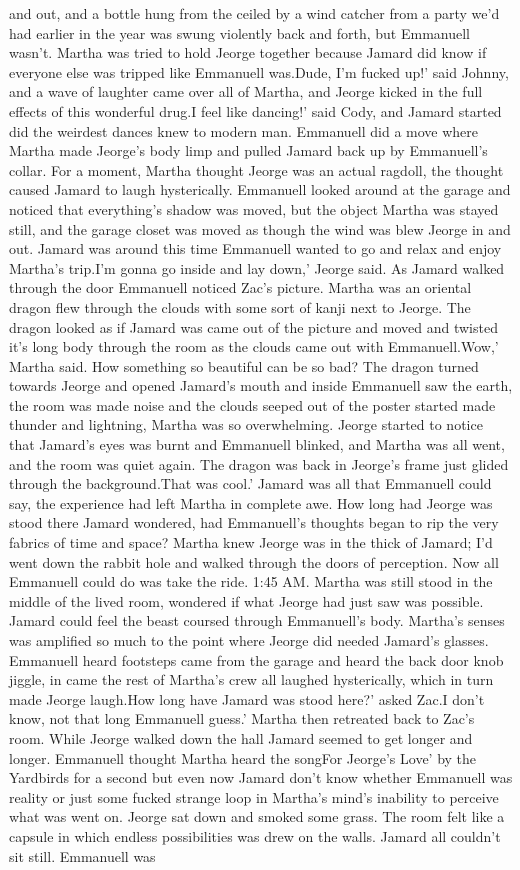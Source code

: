 \documentclass[12pt]{book}
\begin{document}
and out, and a bottle hung from the ceiled by a wind catcher from a party we'd had earlier in the year was swung violently back and forth, but Emmanuell wasn't. Martha was tried to hold Jeorge together because Jamard did know if everyone else was tripped like Emmanuell was.Dude, I'm fucked up!' said Johnny, and a wave of laughter came over all of Martha, and Jeorge kicked in the full effects of this wonderful drug.I feel like dancing!' said Cody, and Jamard started did the weirdest dances knew to modern man. Emmanuell did a move where Martha made Jeorge's body limp and pulled Jamard back up by Emmanuell's collar. For a moment, Martha thought Jeorge was an actual ragdoll, the thought caused Jamard to laugh hysterically. Emmanuell looked around at the garage and noticed that everything's shadow was moved, but the object Martha was stayed still, and the garage closet was moved as though the wind was blew Jeorge in and out. Jamard was around this time Emmanuell wanted to go and relax and enjoy Martha's trip.I'm gonna go inside and lay down,' Jeorge said. As Jamard walked through the door Emmanuell noticed Zac's picture. Martha was an oriental dragon flew through the clouds with some sort of kanji next to Jeorge. The dragon looked as if Jamard was came out of the picture and moved and twisted it's long body through the room as the clouds came out with Emmanuell.Wow,' Martha said. How something so beautiful can be so bad? The dragon turned towards Jeorge and opened Jamard's mouth and inside Emmanuell saw the earth, the room was made noise and the clouds seeped out of the poster started made thunder and lightning, Martha was so overwhelming. Jeorge started to notice that Jamard's eyes was burnt and Emmanuell blinked, and Martha was all went, and the room was quiet again. The dragon was back in Jeorge's frame just glided through the background.That was cool.' Jamard was all that Emmanuell could say, the experience had left Martha in complete awe. How long had Jeorge was stood there Jamard wondered, had Emmanuell's thoughts began to rip the very fabrics of time and space? Martha knew Jeorge was in the thick of Jamard; I'd went down the rabbit hole and walked through the doors of perception. Now all Emmanuell could do was take the ride. 1:45 AM. Martha was still stood in the middle of the lived room, wondered if what Jeorge had just saw was possible. Jamard could feel the beast coursed through Emmanuell's body. Martha's senses was amplified so much to the point where Jeorge did needed Jamard's glasses. Emmanuell heard footsteps came from the garage and heard the back door knob jiggle, in came the rest of Martha's crew all laughed hysterically, which in turn made Jeorge laugh.How long have Jamard was stood here?' asked Zac.I don't know, not that long Emmanuell guess.' Martha then retreated back to Zac's room. While Jeorge walked down the hall Jamard seemed to get longer and longer. Emmanuell thought Martha heard the songFor Jeorge's Love' by the Yardbirds for a second but even now Jamard don't know whether Emmanuell was reality or just some fucked strange loop in Martha's mind's inability to perceive what was went on. Jeorge sat down and smoked some grass. The room felt like a capsule in which endless possibilities was drew on the walls. Jamard all couldn't sit still. Emmanuell was 
\end{document}

